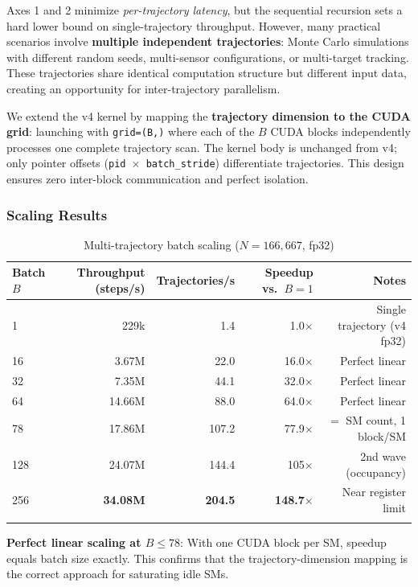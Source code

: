 \documentclass[pdflatex,sn-mathphys-num]{sn-jnl}%
\theoremstyle{thmstyleone}%
\theoremstyle{thmstyletwo}%
\theoremstyle{thmstylethree}%
\begin{document}
Axes 1 and 2 minimize \textit{per-trajectory latency}, but the sequential recursion sets a hard lower bound on single-trajectory throughput. However, many practical scenarios involve \textbf{multiple independent trajectories}: Monte Carlo simulations with different random seeds, multi-sensor configurations, or multi-target tracking. These trajectories share identical computation structure but different input data, creating an opportunity for inter-trajectory parallelism.

We extend the v4 kernel by mapping the \textbf{trajectory dimension to the CUDA grid}: launching with \texttt{grid=(B,)} where each of the $B$ CUDA blocks independently processes one complete trajectory scan. The kernel body is unchanged from v4; only pointer offsets (\texttt{pid $\times$ batch\_stride}) differentiate trajectories. This design ensures zero inter-block communication and perfect isolation.

\subsubsection{Scaling Results}

\begin{table}[h]
\caption{Multi-trajectory batch scaling ($N=166{,}667$, fp32)}\label{tab:batch}
\begin{tabular}{@{}lrrrr@{}}
\toprule
Batch $B$ & Throughput (steps/s) & Trajectories/s & Speedup vs.~$B{=}1$ & Notes \\
\midrule
1  & 229k       & 1.4   & 1.0$\times$   & Single trajectory (v4 fp32) \\
16 & 3.67M      & 22.0  & 16.0$\times$  & Perfect linear \\
32 & 7.35M      & 44.1  & 32.0$\times$  & Perfect linear \\
64 & 14.66M     & 88.0  & 64.0$\times$  & Perfect linear \\
78 & 17.86M     & 107.2 & 77.9$\times$  & $=$ SM count, 1 block/SM \\
128 & 24.07M    & 144.4 & 105$\times$    & 2nd wave (occupancy) \\
256 & \textbf{34.08M} & \textbf{204.5} & \textbf{148.7$\times$} & Near register limit \\
\botrule
\end{tabular}
\end{table}

\textbf{Perfect linear scaling at $B \leq 78$}: With one CUDA block per SM, speedup equals batch size exactly. This confirms that the trajectory-dimension mapping is the correct approach for saturating idle SMs.
\end{document}
